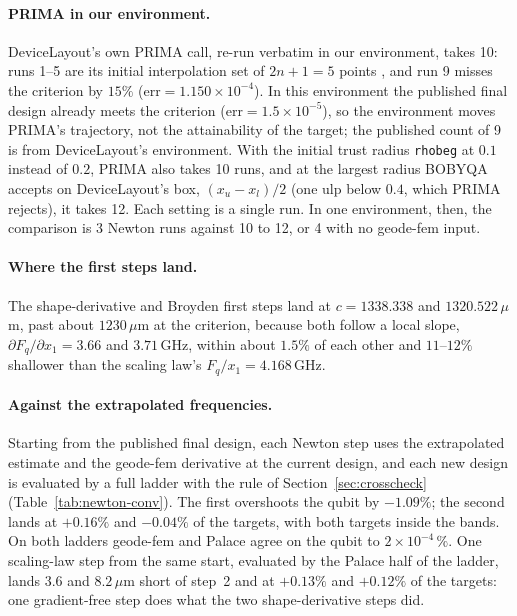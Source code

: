 \documentclass{anvil-paper}
\begin{document}
\paragraph{PRIMA in our environment.}
DeviceLayout's own PRIMA call,
re-run verbatim in our environment, takes 10: runs 1--5 are its initial
interpolation set of $2n+1 = 5$ points \citep{powell2009bobyqa}, and run 9
misses the criterion by $15\%$ ($\mathrm{err} = 1.150\times10^{-4}$). In
this environment the published final design already meets the criterion
($\mathrm{err} = 1.5\times10^{-5}$), so the environment moves PRIMA's
trajectory, not the attainability of the target; the published count of 9
is from DeviceLayout's environment. With the initial trust radius
\texttt{rhobeg} at $0.1$ instead of $0.2$, PRIMA also takes 10 runs, and
at the largest radius BOBYQA accepts on DeviceLayout's box, $(x_u -
x_l)/2$ (one ulp below $0.4$, which PRIMA rejects), it takes 12. Each setting is a single run. In one environment, then, the
comparison is 3 Newton runs against 10 to 12, or 4 with no geode-fem input.

\paragraph{Where the first steps land.}
The shape-derivative and Broyden first steps land at $c = 1338.338$ and
$1320.522\,\mu$m, past about $1230\,\mu$m at the criterion, because both
follow a local slope, $\partial F_q/\partial x_1 = 3.66$ and $3.71$\,GHz,
within about $1.5\%$ of each other and $11$--$12\%$ shallower than the
scaling law's $F_q/x_1 = 4.168$\,GHz.

\paragraph{Against the extrapolated frequencies.}
Starting from the published final design, each Newton step uses the
extrapolated estimate and the geode-fem derivative at the current design,
and each new design is evaluated by a full ladder with the rule of
Section~\ref{sec:crosscheck} (Table~\ref{tab:newton-conv}).
The first overshoots the qubit by $-1.09\%$; the second lands at $+0.16\%$
and $-0.04\%$ of the targets, with both targets inside the bands. On both
ladders geode-fem and Palace agree on the qubit to $2\times10^{-4}\,\%$.
One scaling-law step from the same start, evaluated by the Palace half of
the ladder, lands $3.6$ and $8.2\,\mu$m short of step~2 and at $+0.13\%$
and $+0.12\%$ of the targets: one gradient-free step does what the two
shape-derivative steps did.
\end{document}
